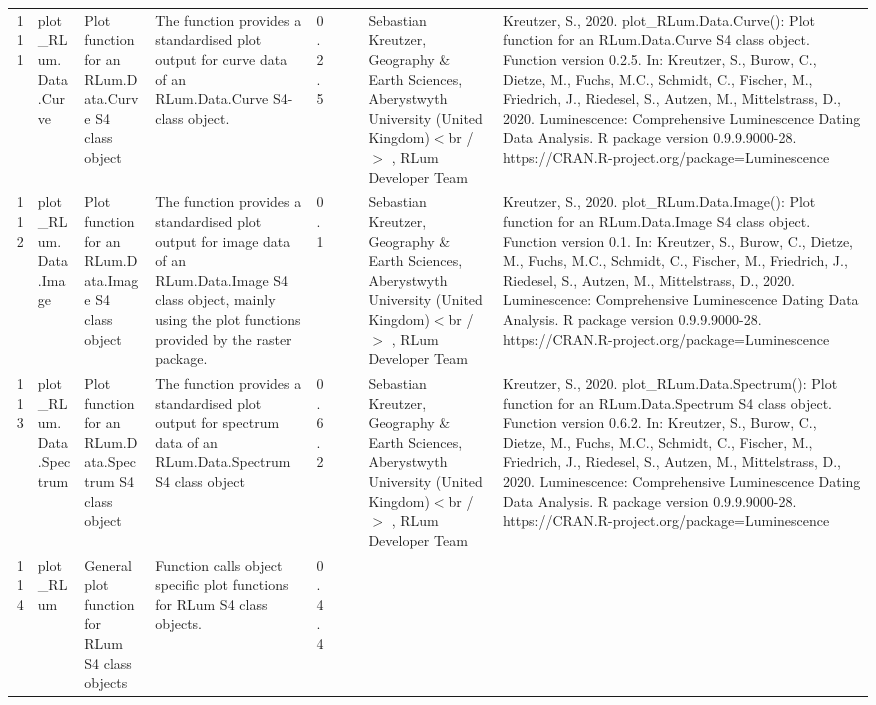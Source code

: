 \begin{table}[ht]
\begin{tabular}{rllllllll}
 \\ 
  111 & plot\_RLum.Data.Curve & Plot function for an RLum.Data.Curve S4 class object & The function provides a standardised plot output for curve data of an RLum.Data.Curve  S4-class object. & 0.2.5
 &  &  & Sebastian Kreutzer, Geography \& Earth Sciences, Aberystwyth University (United Kingdom)$<$br /$>$ , RLum Developer Team & Kreutzer, S., 2020. plot\_RLum.Data.Curve(): Plot function for an RLum.Data.Curve S4 class object. Function version 0.2.5. In: Kreutzer, S., Burow, C., Dietze, M., Fuchs, M.C., Schmidt, C., Fischer, M., Friedrich, J., Riedesel, S., Autzen, M., Mittelstrass, D., 2020. Luminescence: Comprehensive Luminescence Dating Data Analysis. R package version 0.9.9.9000-28. https://CRAN.R-project.org/package=Luminescence
 \\ 
  112 & plot\_RLum.Data.Image & Plot function for an  RLum.Data.Image  S4 class object & The function provides a standardised plot output for image data of an RLum.Data.Image S4 class object, mainly using the plot functions provided by the  raster  package. & 0.1
 &  &  & Sebastian Kreutzer, Geography \& Earth Sciences, Aberystwyth University (United Kingdom)$<$br /$>$ , RLum Developer Team & Kreutzer, S., 2020. plot\_RLum.Data.Image(): Plot function for an RLum.Data.Image S4 class object. Function version 0.1. In: Kreutzer, S., Burow, C., Dietze, M., Fuchs, M.C., Schmidt, C., Fischer, M., Friedrich, J., Riedesel, S., Autzen, M., Mittelstrass, D., 2020. Luminescence: Comprehensive Luminescence Dating Data Analysis. R package version 0.9.9.9000-28. https://CRAN.R-project.org/package=Luminescence
 \\ 
  113 & plot\_RLum.Data.Spectrum & Plot function for an RLum.Data.Spectrum S4 class object & The function provides a standardised plot output for spectrum data of an RLum.Data.Spectrum S4 class object & 0.6.2
 &  &  & Sebastian Kreutzer, Geography \& Earth Sciences, Aberystwyth University (United Kingdom)$<$br /$>$ , RLum Developer Team & Kreutzer, S., 2020. plot\_RLum.Data.Spectrum(): Plot function for an RLum.Data.Spectrum S4 class object. Function version 0.6.2. In: Kreutzer, S., Burow, C., Dietze, M., Fuchs, M.C., Schmidt, C., Fischer, M., Friedrich, J., Riedesel, S., Autzen, M., Mittelstrass, D., 2020. Luminescence: Comprehensive Luminescence Dating Data Analysis. R package version 0.9.9.9000-28. https://CRAN.R-project.org/package=Luminescence
 \\ 
  114 & plot\_RLum & General plot function for RLum S4 class objects & Function calls object specific plot functions for RLum S4 class objects. & 0.4.4

\end{tabular}
\end{table}

